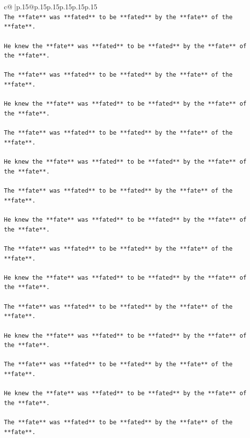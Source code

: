\documentclass{article}
\begin{document}
{\begin{supertabular}{c@{$\;$}|p{.15\linewidth}@{}p{.15\linewidth}p{.15\linewidth}p{.15\linewidth}p{.15\linewidth}p{.15\linewidth}}
{{{\\ 
\texttt{The **fate** was **fated** to be **fated** by the **fate** of the **fate**.} \\
\\ 
\texttt{He knew the **fate** was **fated** to be **fated** by the **fate** of the **fate**.} \\
\\ 
\texttt{The **fate** was **fated** to be **fated** by the **fate** of the **fate**.} \\
\\ 
\texttt{He knew the **fate** was **fated** to be **fated** by the **fate** of the **fate**.} \\
\\ 
\texttt{The **fate** was **fated** to be **fated** by the **fate** of the **fate**.} \\
\\ 
\texttt{He knew the **fate** was **fated** to be **fated** by the **fate** of the **fate**.} \\
\\ 
\texttt{The **fate** was **fated** to be **fated** by the **fate** of the **fate**.} \\
\\ 
\texttt{He knew the **fate** was **fated** to be **fated** by the **fate** of the **fate**.} \\
\\ 
\texttt{The **fate** was **fated** to be **fated** by the **fate** of the **fate**.} \\
\\ 
\texttt{He knew the **fate** was **fated** to be **fated** by the **fate** of the **fate**.} \\
\\ 
\texttt{The **fate** was **fated** to be **fated** by the **fate** of the **fate**.} \\
\\ 
\texttt{He knew the **fate** was **fated** to be **fated** by the **fate** of the **fate**.} \\
\\ 
\texttt{The **fate** was **fated** to be **fated** by the **fate** of the **fate**.} \\
\\ 
\texttt{He knew the **fate** was **fated** to be **fated** by the **fate** of the **fate**.} \\
\\ 
\texttt{The **fate** was **fated** to be **fated** by the **fate** of the **fate**.} \\
}}}
\end{supertabular}}
\end{document}
